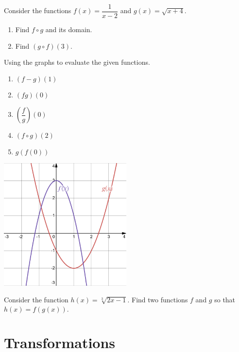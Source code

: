 \begin{exercise}
  Consider the functions $f(x)=\dfrac{1}{x-2}$ and $g(x)=\sqrt{x+4}$.

\begin{enumerate}
  \item Find $f\circ g$ and its domain.
  \item Find $(g\circ f)(3)$.
\end{enumerate}
\end{exercise}

\newpage

\begin{exercise}
    Using the graphs to evaluate the given functions.
    \begin{multicols}{2}
      \begin{enumerate}
        \item $(f-g)(1)$
        \item $(fg)(0)$
        \item $\left(\dfrac{f}{g}\right)(0)$
        \item $(f\circ g)(2)$
        \item $g(f(0))$
      \end{enumerate}
      \columnbreak
      \includegraphics[width=0.5\textwidth]{figs/two-quadratics-exr.png}
    \end{multicols}
\end{exercise}

\begin{exercise}
  Consider the function $h(x)=\sqrt[3]{2x-1}$. Find two functions $f$ and $g$ so that $h(x)=f(g(x))$.
\end{exercise}

\newpage

\section{Transformations}

